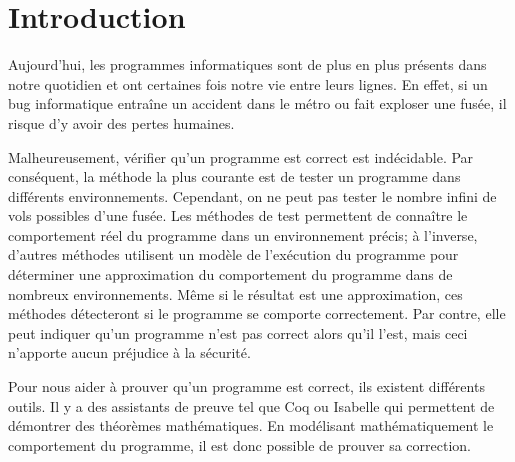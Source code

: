 \documentclass[11pt,openany]{article}
\begin{document}
\section*{Introduction}
		Aujourd'hui, les programmes informatiques sont de plus en plus pr\'esents dans notre quotidien et ont certaines fois notre vie entre leurs lignes. En effet, si un bug informatique entra\^ine un accident dans le m\'etro ou fait exploser une fus\'ee, il risque d'y avoir des pertes humaines. \par
		Malheureusement, v\'erifier qu'un programme est correct est ind\'ecidable. Par cons\'equent, la m\'ethode la plus courante est de tester un programme dans diff\'erents environnements. Cependant, on ne peut pas tester le nombre infini de vols possibles d'une fus\'ee. Les m\'ethodes de test permettent de conna\^itre le comportement r\'eel du programme dans un environnement pr\'ecis; \`a l'inverse, d'autres m\'ethodes utilisent un mod\`ele de l'ex\'ecution du programme pour d\'eterminer une approximation du comportement du programme dans de nombreux environnements. M\^eme si le r\'esultat est une approximation, ces m\'ethodes d\'etecteront si le programme se comporte correctement. Par contre, elle peut indiquer qu'un programme n'est pas correct alors qu'il l'est, mais ceci n'apporte aucun pr\'ejudice \`a la s\'ecurit\'e.
\par 

		Pour nous aider \`a prouver qu'un programme est correct, ils existent diff\'erents outils. Il y a des assistants de preuve tel que Coq ou Isabelle qui permettent de d\'emontrer des th\'eor\`emes math\'ematiques. En mod\'elisant math\'ematiquement le comportement du programme, il est donc possible de prouver sa correction. \par
		
\end{document}
